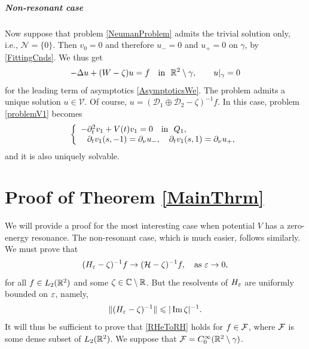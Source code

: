\subparagraph{Non-resonant case}
Now suppose that problem \eqref{NeumanProblem} admits the trivial solution only, i.e.,  $\mathcal{N}=\{0\}$.  Then $v_0=0$ and therefore $u_-=0$ and $u_+=0$ on $\gamma$, by \eqref{FittingCnds}. We thus get
$$
-\Delta u+(W-\zeta)u=f \quad \hbox{in \ } \mathbb R^2\setminus \gamma,\qquad
 u|_{\gamma}=0
$$
for the leading term of asymptotics \eqref{AsymptoticsWe}.
The problem admits a unique solution $u\in \mathcal{V}$. Of course,
$u=(\mathcal{D}_1\oplus\mathcal{D}_2-\zeta)^{-1}f$.
In this case, problem \eqref{problemV1} becomes
\begin{equation}\label{problemV1Non}
\left\{
  \begin{array}{ll}
    -\partial_t^2 v_1+V(t)v_1=0\quad \hbox{in \ } Q_1, \\
    \phantom{-}\partial_t v_1(s, -1)=\partial_\nu u_-, \quad
\partial_t v_1(s, 1)=\partial_\nu u_+,
  \end{array}
\right.
\end{equation}
and it is also uniquely solvable.









\section{Proof of Theorem \ref{MainThrm}}
\label{Sec:Proof}

We will provide a proof for the most interesting case when potential $V$ has a zero-energy resonance. The non-resonant case, which
is much easier, follows similarly. We must prove that
\begin{equation}\label{RHeToRH}
 (H_\varepsilon-\zeta)^{-1}f\to (\mathcal{H}-\zeta)^{-1}f,\quad \mbox{as } \varepsilon\to 0,
\end{equation}
for all $f\in L_2(\mathbb R^2)$ and some $\zeta\in \mathbb C\setminus\mathbb R$.
But the resolvents of $H_\varepsilon$ are uniformly bounded on $\varepsilon$, namely,
$$
     \|(H_\varepsilon-\zeta)^{-1}\|\leqslant |\mathop{\rm Im} \zeta|^{-1}.
$$
It will thus be sufficient to prove that  \eqref{RHeToRH} holds for
$f\in \mathcal{F}$, where $\mathcal{F}$ is some dense subset of $L_2(\mathbb R^2)$. We suppose that $\mathcal{F}=C^\infty_0(\mathbb R^2\setminus\gamma)$.

